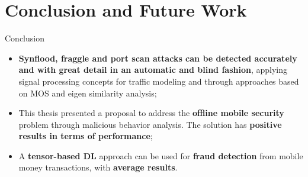 \documentclass[newPxFont, numfooter, sectionpages]{beamer}
\begin{document}
\section{Conclusion and Future Work}
\begin{frame}[c]{Conclusion}

	\begin{itemize}
		\item \textbf{Synflood, fraggle and port scan attacks can be detected accurately and with great detail in an automatic and blind fashion}, applying signal processing concepts for traffic modeling and through approaches based on MOS and eigen similarity analysis;
		\item This thesis presented a proposal to address the \textbf{offline mobile security} problem through malicious behavior analysis. The solution has \textbf{positive results in terms of performance};
		\item A \textbf{tensor-based DL} approach can be used for \textbf{fraud detection} from mobile money transactions, with \textbf{average results}.
	\end{itemize}

\end{frame}
\end{document}
